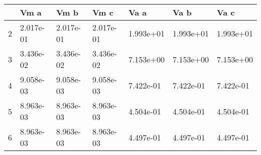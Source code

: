\begin{tabular}{lllllll}
\toprule
{} &       Vm a &       Vm b &       Vm c &       Va a &       Va b &       Va c \\
\midrule
2 &  2.017e-01 &  2.017e-01 &  2.017e-01 &  1.993e+01 &  1.993e+01 &  1.993e+01 \\
3 &  3.436e-02 &  3.436e-02 &  3.436e-02 &  7.153e+00 &  7.153e+00 &  7.153e+00 \\
4 &  9.058e-03 &  9.058e-03 &  9.058e-03 &  7.422e-01 &  7.422e-01 &  7.422e-01 \\
5 &  8.963e-03 &  8.963e-03 &  8.963e-03 &  4.504e-01 &  4.504e-01 &  4.504e-01 \\
6 &  8.963e-03 &  8.963e-03 &  8.963e-03 &  4.497e-01 &  4.497e-01 &  4.497e-01 \\
\bottomrule
\end{tabular}
